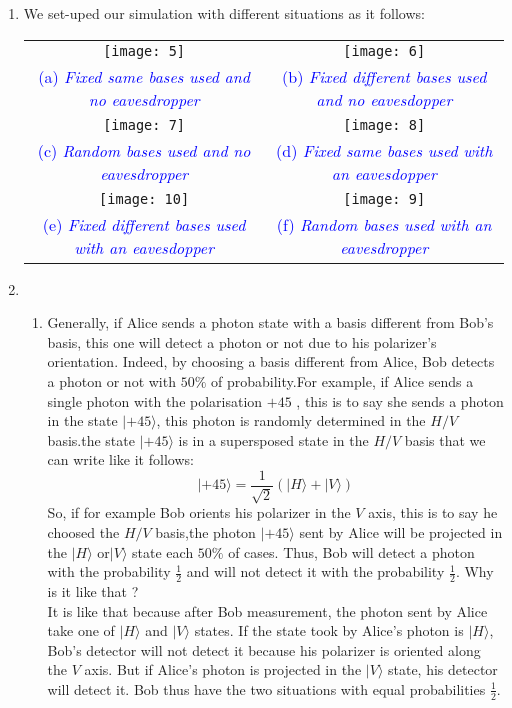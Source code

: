 \documentclass[a4paper,12pt]{article}
\newcommand{\ket}[1]{|#1\rangle}
\newcommand{\kH}{|H\rangle}
\newcommand{\kV}{|V\rangle}
\newcommand{\tbl}[1]{\textcolor{blue}{#1}}
\newcommand{\sq}[1]{\sqrt{#1}}
\newcommand{\fr}[1]{\frac{1}{#1}}
\begin{document}
		\begin{enumerate}
		\item  We set-uped our simulation with different situations as it follows:\\
		
		\hspace{-2.5cm}\begin{tabular}{cc}
				\texttt{[image: 5]}  & \texttt{[image: 6]}\\
				\tbl{(a) \emph{ Fixed same bases used and no eavesdropper }} & \tbl{(b) \emph{ Fixed different bases used and no eavesdopper}}\\
					\texttt{[image: 7]}  & \texttt{[image: 8]}\\
					\tbl{(c) \emph{Random bases used and no eavesdropper}} & \tbl{(d) \emph{Fixed same bases used with an eavesdopper}}\\
						\texttt{[image: 10]}  & \texttt{[image: 9]}\\
							\tbl{(e) \emph{Fixed different bases used with an eavesdopper }} & \tbl{(f) \emph{Random bases used with an eavesdropper}}\\
			\end{tabular}
	\item \begin{enumerate}[label=\alph*)] \item Generally, if Alice sends a photon state with a basis different from Bob's basis, this one will detect a photon or not due to his polarizer's orientation. Indeed, by choosing a basis different from Alice, Bob detects a photon or not with $50\%$ of probability.For example, if Alice sends a single photon with the polarisation $+45$ , this is to say she sends a photon in the state $\ket{+45}$, this photon is randomly determined in the $H/V$ basis.the state $\ket{+45}$ is in a supersposed state in the $H/V$ basis that we can write like it follows:
	$$
	\ket{+45}=\frac{1}{\sq{2}}(\kH + \kV)
	$$
So, if for example Bob orients his polarizer in the $V$ axis, this is to say he choosed the $H/V$ basis,the photon $\ket{+45}$ sent by Alice will be projected in the $\kH$ or$\kV$ state each $50\%$ of cases. Thus, Bob will detect a photon with the probability $\fr{2}$ and will not detect it with the probability $\fr{2}$. Why is it like that ?\\
It is like that because after Bob measurement, the photon sent by Alice take one of $\kH$ and $\kV$ states. If the state took by Alice's photon is $\kH$, Bob's detector will not detect it because his polarizer is oriented along the $V$ axis. But if Alice's photon is projected in the $\kV$ state, his detector will detect it. Bob thus have the two situations with equal probabilities $\fr{2}$.

\end{enumerate}
\end{enumerate}
\end{document}
